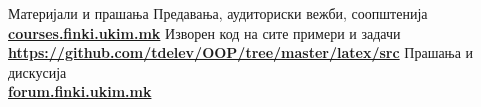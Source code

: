 \begin{frame}{Материјали и прашања}{}
    Предавања, аудиториски вежби, соопштенија\\
    \href{http://courses.finki.ukim.mk/}{\textbf{courses.finki.ukim.mk}}
    \vfill
    Изворен код на сите примери и задачи\\
    \href{https://github.com/tdelev/OOP/tree/master/latex/src}{\textbf{https://github.com/tdelev/OOP/tree/master/latex/src}}
    \vfill
    Прашања и дискусија\\
    \href{http://forum.finki.ukim.mk}{\textbf{forum.finki.ukim.mk}}
\end{frame}
